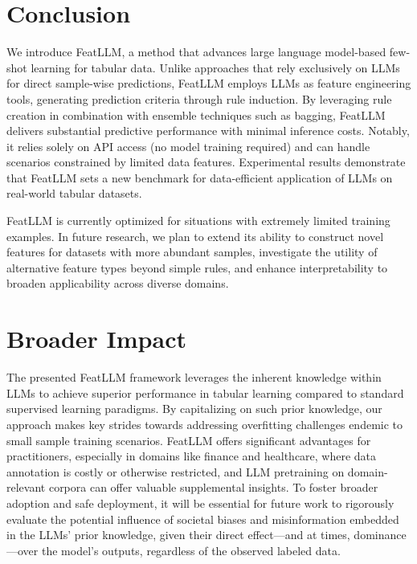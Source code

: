 \section{Conclusion}
We introduce \textsf{FeatLLM}, a method that advances large language model-based few-shot learning for tabular data. Unlike approaches that rely exclusively on LLMs for direct sample-wise predictions, \textsf{FeatLLM} employs LLMs as feature engineering tools, generating prediction criteria through rule induction. By leveraging rule creation in combination with ensemble techniques such as bagging, \textsf{FeatLLM} delivers substantial predictive performance with minimal inference costs. Notably, it relies solely on API access (no model training required) and can handle scenarios constrained by limited data features. Experimental results demonstrate that \textsf{FeatLLM} sets a new benchmark for data-efficient application of LLMs on real-world tabular datasets.

\textsf{FeatLLM} is currently optimized for situations with extremely limited training examples. In future research, we plan to extend its ability to construct novel features for datasets with more abundant samples, investigate the utility of alternative feature types beyond simple rules, and enhance interpretability to broaden applicability across diverse domains.

\section{Broader Impact}
The presented \textsf{FeatLLM} framework leverages the inherent knowledge within LLMs to achieve superior performance in tabular learning compared to standard supervised learning paradigms. By capitalizing on such prior knowledge, our approach makes key strides towards addressing overfitting challenges endemic to small sample training scenarios. \textsf{FeatLLM} offers significant advantages for practitioners, especially in domains like finance and healthcare, where data annotation is costly or otherwise restricted, and LLM pretraining on domain-relevant corpora can offer valuable supplemental insights. To foster broader adoption and safe deployment, it will be essential for future work to rigorously evaluate the potential influence of societal biases and misinformation embedded in the LLMs' prior knowledge, given their direct effect—and at times, dominance—over the model's outputs, regardless of the observed labeled data.

